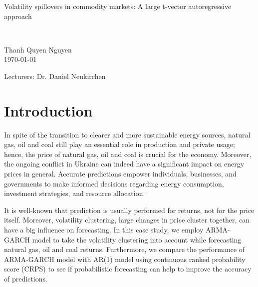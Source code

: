 \documentclass[12pt,a4paper]{article}
\numberwithin{equation}{section}
\begin{document}
\begin{titlepage}
\begin{center}
   \vspace{3cm}

\begin{large}
Volatility spillovers in commodity markets: A large t-vector autoregressive approach
\end{large}\\
\color{black}
  \vspace{1cm}
\begin{large}
Thanh Quyen Nguyen\\
 \today                    
 \end{large}

   \vspace{3cm}
\begin{large}
   Lecturers: Dr. Daniel Neukirchen\\
\end{large}

  \end{center}
 \end{titlepage}

\newpage

{
  \hypersetup{linkcolor=black}
  \renewcommand{\baselinestretch}{1.5}\normalsize 
  \tableofcontents
  \thispagestyle{empty}
}


\newpage
\setcounter{page}{1}
\section{Introduction}
\renewcommand{\baselinestretch}{1.5}\normalsize 
In spite of the transition to clearer and more sustainable energy sources, natural gas, oil and coal still play an essential role in production and private usage; hence, the price of natural gas, oil and coal is crucial for the economy. Moreover, the ongoing conflict in Ukraine can indeed have a significant impact on energy prices in general. Accurate predictions empower individuals, businesses, and governments to make informed decisions regarding energy consumption, investment strategies, and resource allocation.

It is well-known that prediction is usually performed for returns, not for the price itself. Moreover, volatility clustering, large changes in price cluster together, can have a big influence on forecasting. In this case study, we employ ARMA-GARCH model to take the volatility clustering into account while forecasting natural gas, oil and coal returns. Furthermore, we compare the performance of ARMA-GARCH model with AR(1) model using continuous ranked probability score (CRPS) to see if probabilistic forecasting can help to improve the accuracy of predictions. 
\end{document}
